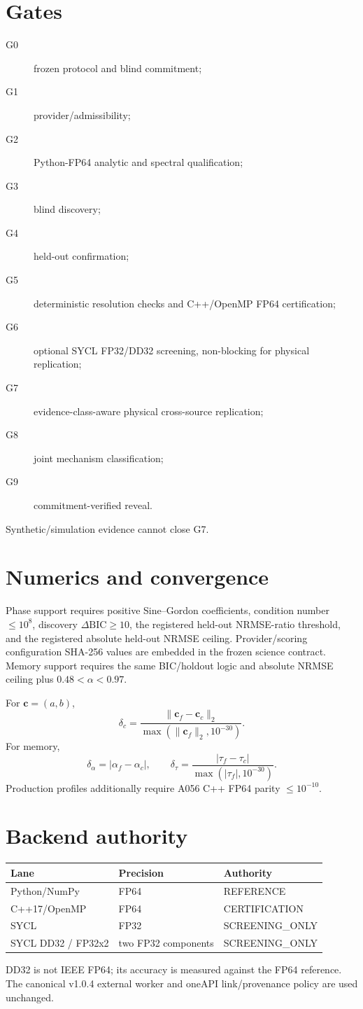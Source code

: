 \documentclass[11pt,a4paper]{article}
\begin{document}
\section{Gates}
\begin{description}
\item[G0] frozen protocol and blind commitment;
\item[G1] provider/admissibility;
\item[G2] Python-FP64 analytic and spectral qualification;
\item[G3] blind discovery;
\item[G4] held-out confirmation;
\item[G5] deterministic resolution checks and C++/OpenMP FP64 certification;
\item[G6] optional SYCL FP32/DD32 screening, non-blocking for physical replication;
\item[G7] evidence-class-aware physical cross-source replication;
\item[G8] joint mechanism classification;
\item[G9] commitment-verified reveal.
\end{description}
Synthetic/simulation evidence cannot close G7.

\section{Numerics and convergence}
Phase support requires positive Sine--Gordon coefficients, condition number $\le 10^8$, discovery $\Delta\mathrm{BIC}\ge10$, the registered held-out NRMSE-ratio threshold, and the registered absolute held-out NRMSE ceiling. Provider/scoring configuration SHA-256 values are embedded in the frozen science contract. Memory support requires the same BIC/holdout logic and absolute NRMSE ceiling plus $0.48<\alpha<0.97$.

For $\mathbf c=(a,b)$,
\[
\delta_c=\frac{\|\mathbf c_f-\mathbf c_c\|_2}{\max(\|\mathbf c_f\|_2,10^{-30})}.
\]
For memory,
\[
\delta_\alpha=|\alpha_f-\alpha_c|,\qquad
\delta_\tau=\frac{|\tau_f-\tau_c|}{\max(|\tau_f|,10^{-30})}.
\]
Production profiles additionally require A056 C++ FP64 parity $\le10^{-10}$.

\section{Backend authority}
\begin{longtable}{lll}\toprule Lane & Precision & Authority\\\midrule
Python/NumPy & FP64 & REFERENCE\\
C++17/OpenMP & FP64 & CERTIFICATION\\
SYCL & FP32 & SCREENING\_ONLY\\
SYCL DD32 / FP32x2 & two FP32 components & SCREENING\_ONLY\\\bottomrule\end{longtable}
DD32 is not IEEE FP64; its accuracy is measured against the FP64 reference. The canonical v1.0.4 external worker and oneAPI link/provenance policy are used unchanged.
\end{document}
